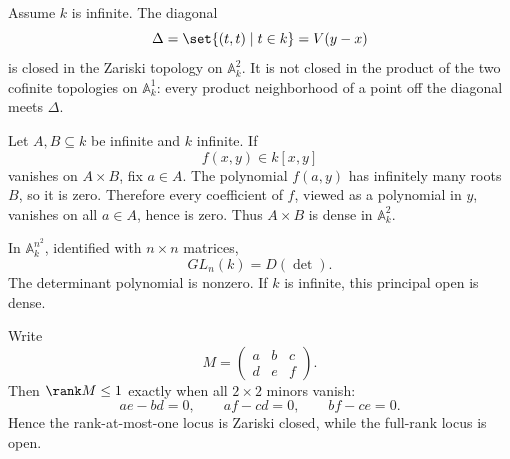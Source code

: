 \begin{example}
Assume \(k\) is infinite.  The diagonal
\[
\Delta=\set{(t,t)\mid t\in k}=V(y-x)
\]
is closed in the Zariski topology on \(\mathbb A_k^2\).  It is not closed in the product of
the two cofinite topologies on \(\mathbb A_k^1\): every product neighborhood of a point off
the diagonal meets \(\Delta\).
\end{example}

\begin{example}
Let \(A,B\subseteq k\) be infinite and \(k\) infinite.  If
\[
f(x,y)\in k[x,y]
\]
vanishes on \(A\times B\), fix \(a\in A\).  The polynomial \(f(a,y)\) has infinitely many
roots \(B\), so it is zero.  Therefore every coefficient of \(f\), viewed as a polynomial
in \(y\), vanishes on all \(a\in A\), hence is zero.  Thus \(A\times B\) is dense in
\(\mathbb A_k^2\).
\end{example}

\begin{example}
In \(\mathbb A_k^{n^2}\), identified with \(n\times n\) matrices,
\[
GL_n(k)=D(\det).
\]
The determinant polynomial is nonzero.  If \(k\) is infinite, this principal open is dense.
\end{example}

\begin{example}
Write
\[
M=\begin{pmatrix}a&b&c\\ d&e&f\end{pmatrix}.
\]
Then \(\rank M\le1\) exactly when all \(2\times2\) minors vanish:
\[
ae-bd=0,\qquad af-cd=0,\qquad bf-ce=0.
\]
Hence the rank-at-most-one locus is Zariski closed, while the full-rank locus is open.
\end{example}
